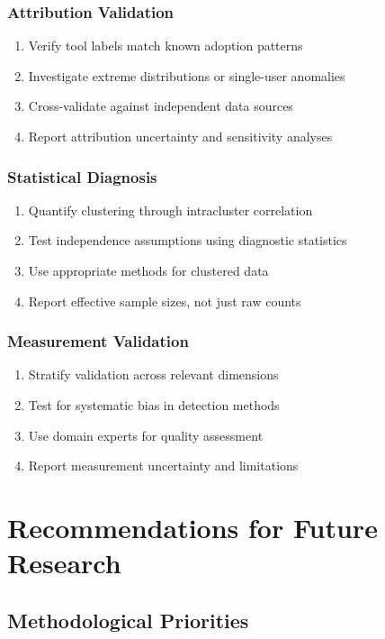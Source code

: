 \documentclass[conference]{IEEEtran}
\begin{document}
\subsubsection{Attribution Validation}
\begin{enumerate}
\item Verify tool labels match known adoption patterns
\item Investigate extreme distributions or single-user anomalies  
\item Cross-validate against independent data sources
\item Report attribution uncertainty and sensitivity analyses
\end{enumerate}

\subsubsection{Statistical Diagnosis}
\begin{enumerate}
\item Quantify clustering through intracluster correlation
\item Test independence assumptions using diagnostic statistics
\item Use appropriate methods for clustered data
\item Report effective sample sizes, not just raw counts
\end{enumerate}

\subsubsection{Measurement Validation}
\begin{enumerate}
\item Stratify validation across relevant dimensions
\item Test for systematic bias in detection methods
\item Use domain experts for quality assessment
\item Report measurement uncertainty and limitations
\end{enumerate}

\section{Recommendations for Future Research}

\subsection{Methodological Priorities}
\end{document}
